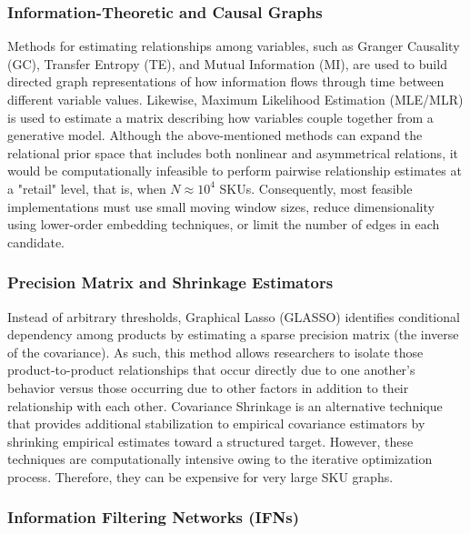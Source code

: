 \subsubsection{Information-Theoretic and Causal Graphs}
\label{subsubsec:info_causal_graphs}

Methods for estimating relationships among variables, such as Granger Causality (GC), Transfer Entropy (TE), and Mutual Information (MI), are used to build directed graph representations of how information flows through time between different variable values. Likewise, Maximum Likelihood Estimation (MLE/MLR) is used to estimate a matrix describing how variables couple together from a generative model. Although the above-mentioned methods can expand the relational prior space that includes both nonlinear and asymmetrical relations, it would be computationally infeasible to perform pairwise relationship estimates at a "retail" level, that is, when  $N \approx 10^4$ \acp{SKU}. Consequently, most feasible implementations must use small moving window sizes, reduce dimensionality using lower-order embedding techniques, or limit the number of edges in each candidate.

\subsubsection{Precision Matrix and Shrinkage Estimators}
\label{subsubsec:precision_shrinkage}

Instead of arbitrary thresholds, Graphical Lasso (GLASSO) \cite{friedman2008glasso} identifies conditional dependency among products by estimating a sparse precision matrix (the inverse of the covariance). As such, this method allows researchers to isolate those product-to-product relationships that occur directly due to one another's behavior versus those occurring due to other factors in addition to their relationship with each other. 
Covariance Shrinkage is an alternative technique that provides additional stabilization to empirical covariance estimators by shrinking empirical estimates toward a structured target. However, these techniques are computationally intensive owing to the iterative optimization process. Therefore, they can be expensive for very large SKU graphs.

\subsubsection{Information Filtering Networks (IFNs)}
\label{subsubsec:ifns}

